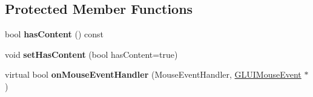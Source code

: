 \subsection*{Protected Member Functions}
\begin{DoxyCompactItemize}
\item 
\hypertarget{classCartWheel_1_1GL_1_1GLUIWindow_ae459aee1b3880e4ee356815d43fcd844}{
bool {\bfseries hasContent} () const }
\label{classCartWheel_1_1GL_1_1GLUIWindow_ae459aee1b3880e4ee356815d43fcd844}

\item 
\hypertarget{classCartWheel_1_1GL_1_1GLUIWindow_ac602f686d24d12dca5d4f77a4b5467cf}{
void {\bfseries setHasContent} (bool hasContent=true)}
\label{classCartWheel_1_1GL_1_1GLUIWindow_ac602f686d24d12dca5d4f77a4b5467cf}

\item 
\hypertarget{classCartWheel_1_1GL_1_1GLUIWindow_ac961089b501b07f28e44e9cc34681caf}{
virtual bool {\bfseries onMouseEventHandler} (MouseEventHandler, \hyperlink{classCartWheel_1_1GL_1_1GLUIMouseEvent}{GLUIMouseEvent} $\ast$)}
\label{classCartWheel_1_1GL_1_1GLUIWindow_ac961089b501b07f28e44e9cc34681caf}

\end{DoxyCompactItemize}
